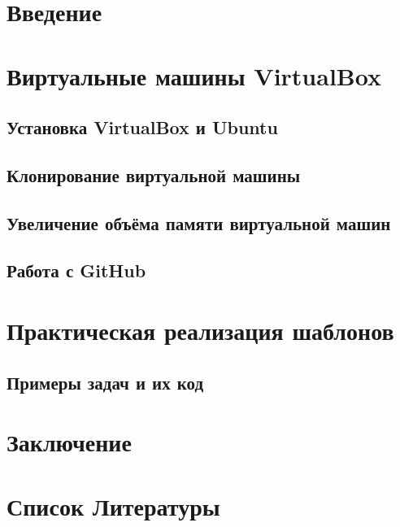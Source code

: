 \documentclass[oneside,final,14pt]{extarticle} %
\begin{document}


\setcounter{page}{2}

\setlength{\parindent}{1.25cm}

\tableofcontents
\newpage

\section{Введение}

\newpage

\section{Виртуальные машины VirtualBox}
\subsection{Установка VirtualBox и Ubuntu}

\newpage

\subsection{Клонирование виртуальной машины}

\newpage

\subsection{Увеличение объёма памяти виртуальной машин}

\newpage

\subsection{Работа с GitHub}

\newpage

\section{Практическая реализация шаблонов}
\subsection{Примеры задач и их код}

\newpage


\section{Заключение}

\newpage

\section{Список Литературы}
\setlength{\parindent}{0cm}

\newpage

\appendix
\end{document}
